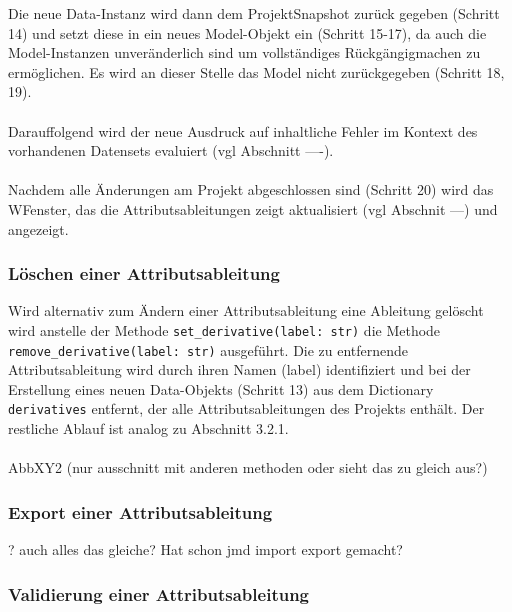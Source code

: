 \documentclass{article}
\begin{document}
\begin{itemize}
Die neue Data-Instanz wird dann dem ProjektSnapshot zurück gegeben (Schritt 14) und setzt diese in ein neues Model-Objekt ein (Schritt 15-17), da auch die Model-Instanzen unveränderlich sind um vollständiges Rückgängigmachen zu ermöglichen. Es wird an dieser Stelle das Model nicht zurückgegeben (Schritt 18, 19).\\\\
Darauffolgend wird der neue Ausdruck auf inhaltliche Fehler im Kontext des vorhandenen Datensets evaluiert (vgl Abschnitt ----).\\\\
Nachdem alle Änderungen am Projekt abgeschlossen sind (Schritt 20) wird das WFenster, das die Attributsableitungen zeigt aktualisiert (vgl Abschnit ---) und angezeigt.


\subsubsection{Löschen einer Attributsableitung}
Wird alternativ zum Ändern einer Attributsableitung eine Ableitung gelöscht wird anstelle der Methode \texttt{set\_derivative(label: str)} die Methode \texttt{remove\_derivative(label: str)} ausgeführt. Die zu entfernende Attributsableitung wird durch ihren Namen (label) identifiziert und bei der Erstellung eines neuen Data-Objekts (Schritt 13) aus dem Dictionary \texttt{derivatives} entfernt, der alle Attributsableitungen des Projekts enthält. Der restliche Ablauf ist analog zu Abschnitt 3.2.1.
\\\\
AbbXY2 (nur ausschnitt mit anderen methoden oder sieht das zu gleich aus?)

\subsubsection{Export einer Attributsableitung}
? auch alles das gleiche? Hat schon jmd import export gemacht?


\subsubsection{Validierung einer Attributsableitung}


\end{itemize}
\end{document}
